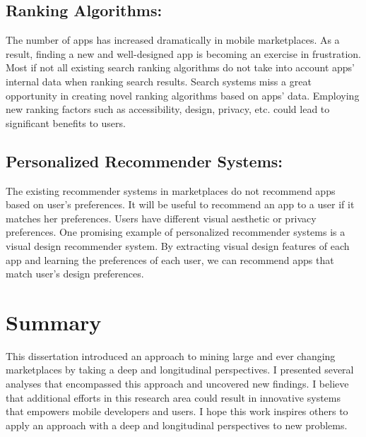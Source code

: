 \subsection*{Ranking Algorithms:}
The number of apps has increased dramatically in mobile marketplaces.
As a result, finding a new and well-designed app is becoming an exercise in frustration.
Most if not all existing search ranking algorithms do not take into account apps' internal data when ranking search results.
Search systems miss a great opportunity in creating novel ranking algorithms based on apps' data.
Employing new ranking factors such as accessibility, design, privacy, etc. could lead to significant benefits to users.

\subsection*{Personalized Recommender Systems:}
The existing recommender systems in marketplaces do not recommend apps based on user's preferences.
It will be useful to recommend an app to a user if it matches her preferences.
Users have different visual aesthetic or privacy preferences.
One promising example of personalized recommender systems is a visual design recommender system.
By extracting visual design features of each app and learning the preferences of each user, we can recommend apps that match user's design preferences.

\section{Summary}
This dissertation introduced an approach to mining large and ever changing marketplaces by taking a deep and longitudinal perspectives.
I presented several analyses that encompassed this approach and uncovered new findings.
I believe that additional efforts in this research area could result in innovative systems that empowers mobile developers and users.
I hope this work inspires others to apply an approach with a deep and longitudinal perspectives to new problems.